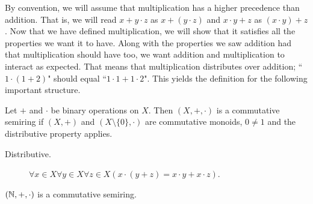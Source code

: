 \documentclass[../main.tex]{subfiles}
\begin{document}
By convention, we will assume that multiplication has a higher precedence than addition. That is, we will read $x+y\cdot z$ as $x+(y\cdot z)$ and $x\cdot y+z$ as $(x\cdot y)+z$. Now that we have defined multiplication, we will show that it satisfies all the properties we want it to have. Along with the properties we saw addition had that multiplication should have too, we want addition and multiplication to interact as expected. That means that multiplication distributes over addition; ``$1\cdot(1+2)$" should equal ``$1\cdot 1+1\cdot 2$". This yields the definition for the following important structure.
\begin{definition}
    Let $+$ and $\cdot$ be binary operations on $X$. Then $(X,+,\cdot)$ is a commutative semiring if $(X,+)$ and $(X\setminus\{0\},\cdot)$ are commutative monoids, $0\neq1$ and the distributive property applies.
    \begin{description}
        \item[Distributive.] $\forall x\in X\forall y\in X\forall z\in X(x\cdot(y+z)=x\cdot y+x\cdot z)$.
    \end{description}
\end{definition}
\begin{proposition}\label{prp:the_natural_numbers_integers_and_rational_numbers:commutative_semiring_natural_numbers}
    $(\mathbb{N},+,\cdot)$ is a commutative semiring.
\end{proposition}
\end{document}
